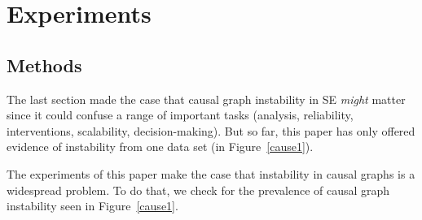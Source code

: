 \documentclass[]{svjour3}
\begin{document}



\section{Experiments}\label{xp}

\subsection{Methods}
The last section made the case that causal graph instability in SE {\em might} matter since it could confuse a range of important tasks (analysis, reliability,
interventions, scalability, decision-making). But so far, this paper has only offered evidence of instability 
  from one data set (in Figure~\ref{cause1}).


The experiments of this paper make the case that instability in causal graphs is a widespread problem. To do that, we check for the prevalence of causal graph instability seen in Figure~\ref{cause1}. 

\end{document}
